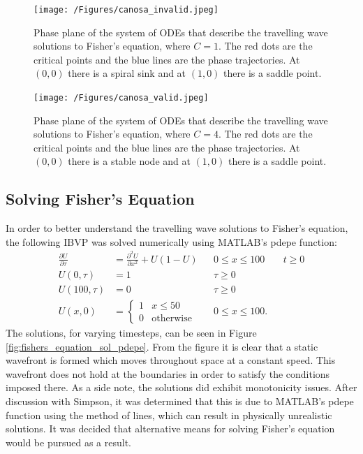 \documentclass[11pt,a4paper]{article}
\begin{document}
		\begin{figure}[tbh]
			\centering
				\texttt{[image: /Figures/canosa\_invalid.jpeg]}
			\caption{Phase plane of the system of ODEs that describe the travelling wave solutions to Fisher's equation, where $C = 1$. The red dots are the critical points and the blue lines are the phase trajectories. At $(0,0)$ there is a spiral sink and at $(1,0)$ there is a saddle point.}
			\label{fig:canosa_invalid}
		\end{figure}

		\begin{figure}[tbh]
			\centering
				\texttt{[image: /Figures/canosa\_valid.jpeg]}
			\caption{Phase plane of the system of ODEs that describe the travelling wave solutions to Fisher's equation, where $C = 4$. The red dots are the critical points and the blue lines are the phase trajectories. At $(0,0)$ there is a stable node and at $(1,0)$ there is a saddle point.}
			\label{fig:canosa_valid}
		\end{figure}


	\subsection{Solving Fisher's Equation}
		\label{sub:solvingfishersequation}
		
		In order to better understand the travelling wave solutions to Fisher's equation, the following IBVP was solved numerically using MATLAB's pdepe function:
		\begin{align*}
			 \label{eq:fisherNumericIBVP}
			 \frac{\partial U}{\partial \tau} &= \frac{\partial^2 U}{\partial x^2} + U(1 - U) && 0 \le x \le 100 && t \ge 0 \\
			 U(0, \tau) &= 1 && \tau \ge 0 \\
			 U(100, \tau) &= 0 && \tau \ge 0 \\
			 U(x, 0) &= 
			 \begin{cases}
   				1 & x \le 50 \\
   				0 & \text{otherwise}
  			\end{cases}
  			&& 0 \le x \le 100.
		\end{align*}
		The solutions, for varying timesteps, can be seen in Figure \ref{fig:fishers_equation_sol_pdepe}. From the figure it is clear that a static wavefront is formed which moves throughout space at a constant speed. This wavefront does not hold at the boundaries in order to satisfy the conditions imposed there. As a side note, the solutions did exhibit monotonicity issues. After discussion with Simpson, it was determined that this is due to MATLAB's pdepe function using the method of lines, which can result in physically unrealistic solutions. It was decided that alternative means for solving Fisher's equation would be pursued as a result. 
\end{document}
